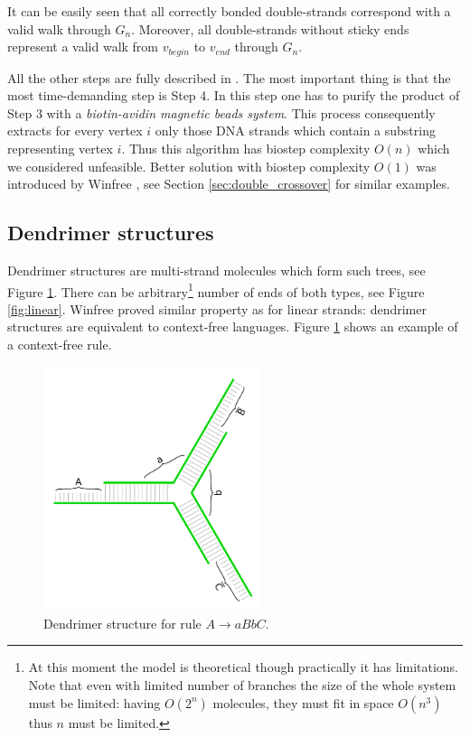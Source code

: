 		It can be easily seen that all correctly bonded double-strands correspond with a valid walk through $G_n$. Moreover, all double-strands without sticky ends represent a valid walk from $v_{begin}$ to $v_{end}$ through $G_n$.
		
		All the other steps are fully described in \cite{adleman94}. The most important thing is that the most time-demanding step is Step 4. In this step one has to purify the product of Step 3 with a {\em biotin-avidin magnetic beads system}. This process consequently extracts for every vertex $i$ only those DNA strands which contain a substring representing vertex $i$. Thus this algorithm has biostep complexity $O(n)$ which we considered unfeasible. Better solution with biostep complexity $O(1)$ was introduced by Winfree \cite{winfree_phd}, see Section \ref{sec:double_crossover} for similar examples.
	
	\subsection{Dendrimer structures}
	\label{sec:dendrimer}
		
		Dendrimer structures are multi-strand molecules which form such trees, see Figure \ref{fig:dendrimer}. There can be arbitrary\footnote{At this moment the model is theoretical though practically it has limitations. Note that even with limited number of branches the size of the whole system must be limited: having $O(2^n)$ molecules, they must fit in space $O(n^3)$ thus $n$ must be limited.} number of ends of both types, see Figure \ref{fig:linear}. Winfree \cite{winfree_phd} proved similar property as for linear strands: dendrimer structures are equivalent to context-free languages. Figure \ref{fig:dendrimer} shows an example of a context-free rule.
		
		\begin{figure}[H]
		\begin{center}
			\includegraphics[width=0.568\textwidth]{./figures/strand_types/dendrimer.pdf}
			\caption{Dendrimer structure for rule $A\rightarrow aBbC$.}
			\label{fig:dendrimer}
		\end{center}
		\end{figure}
	
